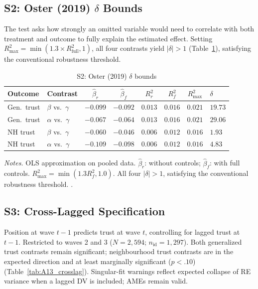 \documentclass[12pt, a4paper]{article}
\newcommand{\tablenote}[1]{\vspace{4pt}\par\footnotesize\textit{Notes.} #1}
\begin{document}
\subsection{S2: Oster (2019) $\delta$ Bounds}
\label{sec:s2}

The \citet{oster2019unobservable} test asks how strongly an omitted variable
would need to correlate with both treatment and outcome to fully explain the
estimated effect. Setting $R^2_{\max} = \min(1.3 \times R^2_{\text{full}},
1)$, all four contrasts yield $|\delta| > 1$
(Table~\ref{tab:A12_oster}), satisfying the conventional robustness threshold.

\begin{table}[H]
\centering
\caption{S2: Oster (2019) $\delta$ bounds}
\label{tab:A12_oster}
\small
\begin{tabular}{llcccccl}
\hline\hline
  Outcome & Contrast & $\hat{\beta}_r$ & $\hat{\beta}_f$ &
  $R^2_r$ & $R^2_f$ & $R^2_{\max}$ & $\delta$ \\
\hline
  Gen.\ trust   & $\beta$ vs.\ $\gamma$ & $-0.099$ & $-0.092$ & $0.013$ & $0.016$ & $0.021$ & $19.73$  \\
  Gen.\ trust   & $\alpha$ vs.\ $\gamma$ & $-0.067$ & $-0.064$ & $0.013$ & $0.016$ & $0.021$ & $29.06$ \\
  NH trust & $\beta$ vs.\ $\gamma$ & $-0.060$ & $-0.046$ & $0.006$ & $0.012$ & $0.016$ & $1.93$ \\
  NH trust & $\alpha$ vs.\ $\gamma$ & $-0.109$ & $-0.098$ & $0.006$ & $0.012$ & $0.016$ & $4.83$  \\
\hline\hline
\end{tabular}
\tablenote{OLS approximation on pooled data. $\hat{\beta}_r$: without controls;
$\hat{\beta}_f$: with full controls. $R^2_{\max} = \min(1.3 R^2_f, 1.0)$.
All four $|\delta| > 1$, satisfying the conventional robustness threshold.
\citep{oster2019unobservable}.}
\end{table}

\subsection{S3: Cross-Lagged Specification}
\label{sec:s3}

Position at wave $t-1$ predicts trust at wave $t$, controlling for lagged
trust at $t-1$. Restricted to waves 2 and 3 ($N = 2{,}594$;
$n_{\text{id}} = 1{,}297$). Both generalized trust contrasts remain
significant; neighbourhood trust contrasts are in the expected direction and
at least marginally significant ($p < .10$)
(Table~\ref{tab:A13_crosslag}). Singular-fit warnings reflect expected
collapse of RE variance when a lagged DV is included; AMEs remain valid.
\end{document}
